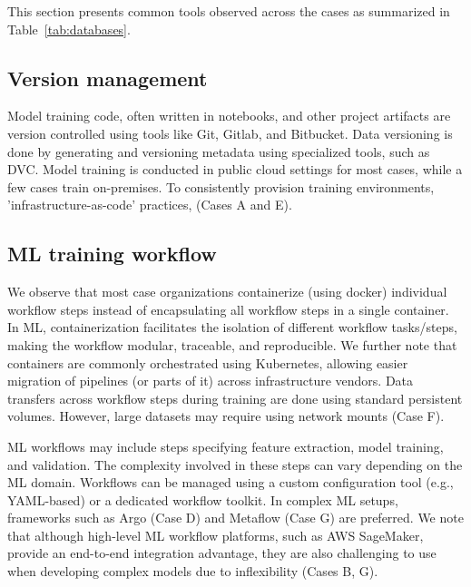This section presents common tools observed across the cases as summarized in Table~\ref{tab:databases}.



\subsection{Version management}
Model training code, often written in notebooks, and other project artifacts are version controlled using tools like Git, Gitlab, and Bitbucket. Data versioning is done by generating and versioning metadata using specialized tools, such as DVC. 
Model training is conducted in public cloud settings for most cases, while a few cases train on-premises. To consistently provision training environments, 'infrastructure-as-code' practices, \DIFdelbegin {}\DIFdelend \DIFaddbegin {}\DIFaddend (Cases A and E).
\DIFdelbegin {}\DIFdelend 


\subsection{ML training workflow}
We observe that most case organizations containerize (using docker) individual workflow steps instead of encapsulating all workflow steps in a single container. In ML, containerization facilitates the isolation of different workflow tasks/steps, making the workflow modular, traceable, and reproducible. We further note that containers are commonly orchestrated using Kubernetes, allowing easier migration of pipelines (or parts of it) across infrastructure vendors. Data transfers across workflow steps during training are done using standard persistent volumes. However, large datasets may require using network mounts (Case F).

ML workflows may include steps specifying feature extraction, model training, and validation. The complexity involved in these steps can vary depending on the ML domain. Workflows can be managed using a custom configuration tool (e.g., YAML-based) or a dedicated workflow toolkit. In complex ML setups, frameworks such as Argo (Case D) and Metaflow (Case G) are preferred. We note that although high-level ML workflow platforms, such as AWS SageMaker, provide an end-to-end integration advantage, they are also challenging to use when developing complex models due to inflexibility (Cases B, G).

